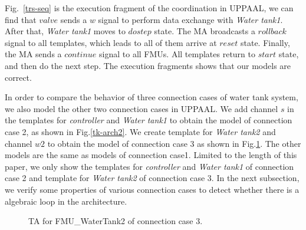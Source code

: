 Fig.~\ref{trs-seq} is the execution fragment of the coordination in UPPAAL, we can find that $valve$ sends a $w$ signal to perform data exchange with \emph{Water tank1}. After that, \emph{Water tank1} moves to $dostep$ state. The MA broadcasts a $rollback$ signal to all templates, which leads to all of them arrive at $reset$ state. Finally, the MA sends a $continue$ signal to all FMUs. All templates return to $start$ state, and then do the next step. The execution fragments shows that our models are correct.

In order to compare the behavior of three connection cases of water tank system, we also model the other two connection cases in UPPAAL. We add channel $s$ in the templates for \emph{controller} and \emph{Water tank1} to obtain the model of connection case 2, as shown in Fig.\ref{tk-arch2}. We create template for \emph{Water tank2} and channel $w2$ to obtain the model of connection case 3 as shown in Fig.\ref{arc3}. The other models are the same as models of connection case1. Limited to the length of this paper, we only show the templates for \emph{controller} and \emph{Water tank1} of connection case 2 and template for \emph{Water tank2} of connection case 3. In the next subsection, we verify some properties of various connection cases to detect whether there is a algebraic loop in the architecture.
\begin{figure}[htbp]
\end{figure}
\begin{figure}[htbp]
	\caption{TA for FMU\_WaterTank2 of connection case 3.}\label{arc3}
\end{figure}

